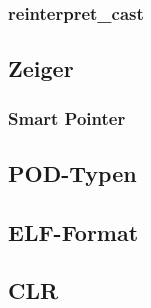 \begin{multicols}{3}
\subsubsection{reinterpret_cast}
\lipsum[1]
\subsection{Zeiger}
\subsubsection{Smart Pointer}
\subsection{POD-Typen}

\subsection{ELF-Format}
\subsection{CLR}


\end{multicols}